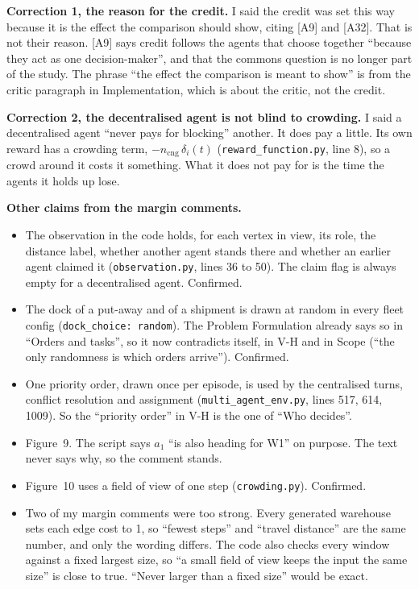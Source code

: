 \documentclass[11pt,a4paper]{article}
\begin{document}
\textbf{Correction 1, the reason for the credit.} I said the credit was set
this way because it is the effect the comparison should show, citing [A9]
and [A32]. That is not their reason. [A9] says credit follows the agents
that choose together ``because they act as one decision-maker'', and that
the commons question is no longer part of the study. The phrase ``the effect
the comparison is meant to show'' is from the critic paragraph in
Implementation, which is about the critic, not the credit.

\textbf{Correction 2, the decentralised agent is not blind to crowding.} I
said a decentralised agent ``never pays for blocking'' another. It does pay
a little. Its own reward has a crowding term, $-n_{\mathrm{cng}}\,\delta_i(t)$
(\texttt{reward\_function.py}, line 8), so a crowd around it costs it
something. What it does not pay for is the time the agents it holds up
lose.

\textbf{Other claims from the margin comments.}
\begin{itemize}[nosep]
  \item The observation in the code holds, for each vertex in view, its role,
        the distance label, whether another agent stands there and whether an
        earlier agent claimed it (\texttt{observation.py}, lines 36 to 50).
        The claim flag is always empty for a decentralised agent. Confirmed.
  \item The dock of a put-away and of a shipment is drawn at random in every
        fleet config (\texttt{dock\_choice: random}). The Problem
        Formulation already says so in ``Orders and tasks'', so it now
        contradicts itself, in V-H and in Scope (``the only randomness is
        which orders arrive''). Confirmed.
  \item One priority order, drawn once per episode, is used by the
        centralised turns, conflict resolution and assignment
        (\texttt{multi\_agent\_env.py}, lines 517, 614, 1009). So the
        ``priority order'' in V-H is the one of ``Who decides''.
  \item Figure~9. The script says $a_1$ ``is also heading for W1'' on
        purpose. The text never says why, so the comment stands.
  \item Figure~10 uses a field of view of one step (\texttt{crowding.py}).
        Confirmed.
  \item Two of my margin comments were too strong. Every generated warehouse
        sets each edge cost to 1, so ``fewest steps'' and ``travel distance''
        are the same number, and only the wording differs. The code also
        checks every window against a fixed largest size, so ``a small field
        of view keeps the input the same size'' is close to true. ``Never
        larger than a fixed size'' would be exact.
\end{itemize}
\end{document}
